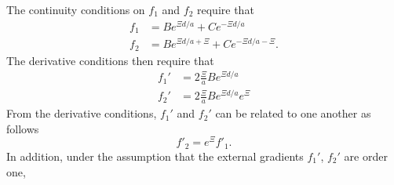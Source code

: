     The continuity conditions on $f_1$ and $f_2$ require that
    \begin{align}
      f_1 &= Be^{\Xi d/a} + C e^{-\Xi d/a}\label{eq:M c1}\\
      f_2 &= Be^{\Xi d/a+\Xi} + C e^{-\Xi d/a-\Xi}\label{eq:M c2}.
    \end{align}
    The derivative conditions then require that
    \begin{align}
      f_1'&= 2\frac{\Xi}{a}Be^{\Xi d/a} \label{eq:M d1}\\
      f_2'&=2\frac{\Xi}{a}Be^{\Xi d/a}e^{\Xi}\label{eq:M d2}
    \end{align}
    From the derivative conditions, $f_1'$ and $f_2'$ can be related to one another as follows
    \begin{equation}
      f'_2 = e^{\Xi}f'_1.
    \end{equation}
    In addition, under the assumption that the external gradients $f_1'$, $f_2'$ are order one,

